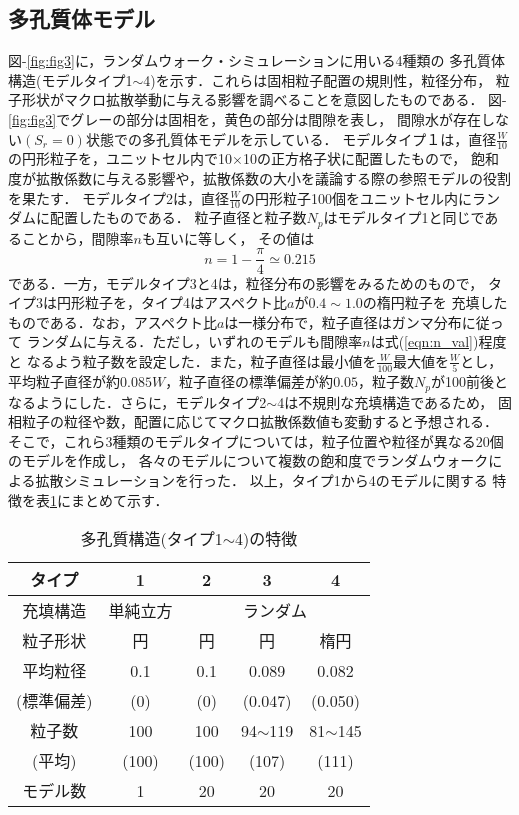 ﻿%
\subsection{多孔質体モデル}
図-\ref{fig:fig3}に，ランダムウォーク・シミュレーションに用いる4種類の
多孔質体構造(モデルタイプ1$\sim$4)を示す．これらは固相粒子配置の規則性，粒径分布，
粒子形状がマクロ拡散挙動に与える影響を調べることを意図したものである．
図-\ref{fig:fig3}でグレーの部分は固相を，黄色の部分は間隙を表し，
間隙水が存在しない$(S_r=0)$状態での多孔質体モデルを示している． 
モデルタイプ１は，直径$\frac{W}{10}$の円形粒子を，ユニットセル内で10$\times$10の正方格子状に配置したもので，
飽和度が拡散係数に与える影響や，拡散係数の大小を議論する際の参照モデルの役割を果たす．
モデルタイプ2は，直径$\frac{W}{10}$の円形粒子100個をユニットセル内にランダムに配置したものである．
粒子直径と粒子数$N_p$はモデルタイプ1と同じであることから，間隙率$n$も互いに等しく，
その値は
\begin{equation}
	n=1-\frac{\pi}{4}\simeq 0.215
	\label{eqn:n_val}
\end{equation}
である．一方，モデルタイプ3と4は，粒径分布の影響をみるためのもので，
タイプ3は円形粒子を，タイプ4はアスペクト比$a$が$0.4\sim 1.0$の楕円粒子を
充填したものである．なお，アスペクト比$a$は一様分布で，粒子直径はガンマ分布に従って
ランダムに与える．ただし，いずれのモデルも間隙率$n$は式(\ref{eqn:n_val})程度と
なるよう粒子数を設定した．また，粒子直径は最小値を$\frac{W}{100}$最大値を$\frac{W}{5}$とし，
平均粒子直径が約$0.085W$，粒子直径の標準偏差が約$0.05$，粒子数$N_p$が100前後と
なるようにした．さらに，モデルタイプ2$\sim$4は不規則な充填構造であるため，
固相粒子の粒径や数，配置に応じてマクロ拡散係数値も変動すると予想される．
そこで，これら3種類のモデルタイプについては，粒子位置や粒径が異なる20個のモデルを作成し，
各々のモデルについて複数の飽和度でランダムウォークによる拡散シミュレーションを行った．
以上，タイプ1から4のモデルに関する
特徴を表\ref{tbl:types}にまとめて示す．
\begin{table}[htb]
  \caption{多孔質構造(タイプ1$\sim$4)の特徴}
  \begin{tabular}{c|c|c|c|c}
\hline
    タイプ & 1 & 2 & 3 & 4 \\
	\hline\hline
	  充填構造& 単純立方& \multicolumn{3}{c}{ランダム} 
	  \\
    \hline
粒子形状 & 円 &円 & 円 & 楕円\\
	\hline
   平均粒径 & 0.1 & 0.1 & 0.089 & 0.082\\ 
 (標準偏差) & (0) & (0) & (0.047) & (0.050) \\
\hline
粒子数 & 100 & 100 & 94$\sim$119 & 81$\sim$145 \\
(平均) & (100) & (100) & (107) & (111) \\
\hline
モデル数& 1 &20 &20 & 20 \\
\hline
  \end{tabular}
\label{tbl:types}
\end{table}

